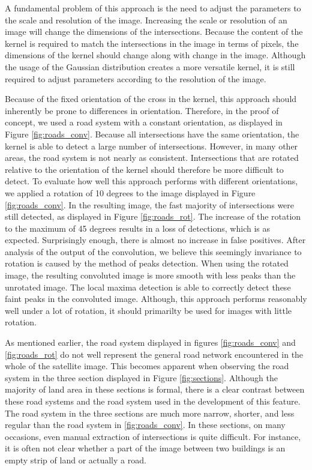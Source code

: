 A fundamental problem of this approach is the need to adjust the parameters to the scale and resolution of the image. Increasing the scale or resolution of an image will
change the dimensions of the intersections. Because the content of the kernel
is required to match the intersections in the image in terms of pixels, the
dimensions of the kernel should change along with change in the image. Although
the usage of the Gaussian distribution creates a more versatile kernel, it is
still required to adjust parameters according to the resolution of the image.

Because of the fixed orientation of the cross in the kernel, this approach
should inherently be prone to differences in orientation. Therefore, in the
proof of concept, we used a road system with a constant orientation, as
displayed in Figure \ref{fig:roads_conv}. Because all intersections have the
same orientation, the kernel is able to detect a large number of intersections.
However, in many other areas, the road system is not nearly as consistent.
Intersections that are rotated relative to the orientation of the kernel should
therefore be more difficult to detect. To evaluate how well this approach performs with different orientations, we
applied a rotation of 10 degrees to the image displayed in Figure
\ref{fig:roads_conv}. In the resulting image, the fast majority of
intersections were still detected, as displayed in Figure \ref{fig:roads_rot}.
The increase of the rotation to the maximum of 45 degrees results in a loss of
detections, which is as expected. Surprisingly enough, there is almost no
increase in false positives. After analysis of the output of the convolution, we believe this seemingly
invariance to rotation is caused by the method of peaks detection.  When using
the rotated image, the resulting convoluted image is more smooth with less
peaks than the unrotated image. The local maxima detection is able to
correctly detect these faint peaks in the convoluted image. Although, this approach performs reasonably well under a lot of rotation, it should primarilty be used for images with little rotation.\newline

\noindent
As mentioned earlier, the road system displayed in figures \ref{fig:roads_conv} and \ref{fig:roads_rot} do not well represent the general road network encountered in the whole of the satellite image. This becomes apparent when observing the road system in the three section displayed in Figure \ref{fig:sections}. Although the majority of land area in these sections is formal, there is a clear contrast between these road systems and the road system used in the development of this feature. The road system in the three sections are much more narrow, shorter, and less regular than the road system in \ref{fig:roads_conv}. In these sections, on many occasions, even manual extraction of intersections is quite difficult. For instance, it is often not clear whether a part of the image between two buildings is an empty strip of land or actually a road. 

